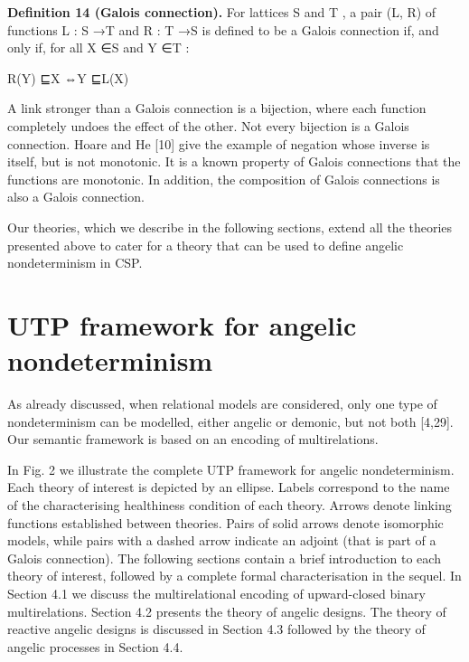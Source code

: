 \documentclass[11pt]{article}
\begin{document}
\noindent\textbf{Definition 14 (Galois connection).} For lattices S and T , a pair (L, R) of functions L : S →T and R : T →S is defined to be a Galois connection if, and only if, for all X ∈S and Y ∈T :


R(Y) ⊑X ⇔Y ⊑L(X)

A link stronger than a Galois connection is a bijection, where each function completely undoes the effect of the other. Not every bijection is a Galois connection. Hoare and He [10] give the example of negation whose inverse is itself, but is not monotonic. It is a known property of Galois connections that the functions are monotonic. In addition, the composition of Galois connections is also a Galois connection.

Our theories, which we describe in the following sections, extend all the theories presented above to cater for a theory that can be used to define angelic nondeterminism in CSP.

\section{UTP framework for angelic nondeterminism}
As already discussed, when relational models are considered, only one type of nondeterminism can be modelled, either angelic or demonic, but not both [4,29]. Our semantic framework is based on an encoding of multirelations.

In Fig. 2 we illustrate the complete UTP framework for angelic nondeterminism. Each theory of interest is depicted by an ellipse. Labels correspond to the name of the characterising healthiness condition of each theory. Arrows denote linking functions established between theories. Pairs of solid arrows denote isomorphic models, while pairs with a dashed arrow indicate an adjoint (that is part of a Galois connection). The following sections contain a brief introduction to each theory of interest, followed by a complete formal characterisation in the sequel. In Section 4.1 we discuss the multirelational encoding of upward-closed binary multirelations. Section 4.2 presents the theory of angelic designs. The theory of reactive angelic designs is discussed in Section 4.3 followed by the theory of angelic processes in Section 4.4.
\end{document}
